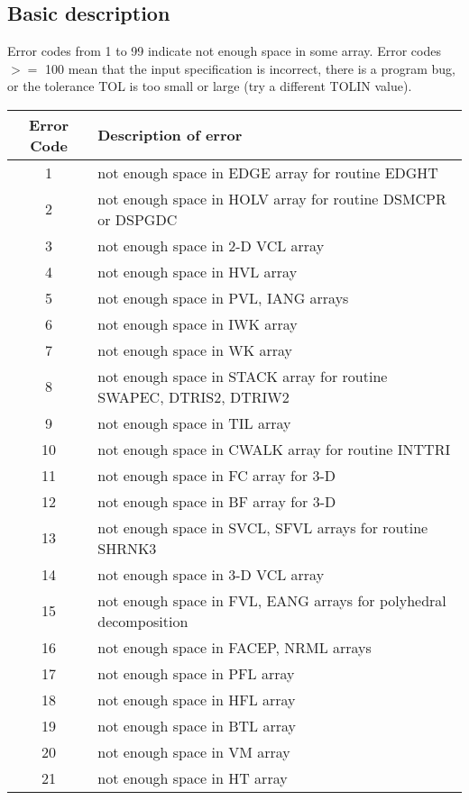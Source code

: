 \begin{appendix}
\section{Basic description}

Error codes from 1 to 99 indicate not enough space in some array.
Error codes $>=$ 100 mean that the input specification is incorrect,
there is a program bug, or the tolerance TOL is too small or large
(try a different TOLIN value).  

{\small
\begin{tabular}[h]{cp{5.5in}}
\bf Error Code &	\bf Description of error \\ 
 \hline
   1  &  not enough space in EDGE array for routine EDGHT \\
   2  &  not enough space in HOLV array for routine DSMCPR or DSPGDC \\
   3  &  not enough space in 2-D VCL array \\
   4  &  not enough space in HVL array \\
   5  &  not enough space in PVL, IANG arrays \\
   6  &  not enough space in IWK array \\
   7  &  not enough space in WK array \\
   8  &  not enough space in STACK array for routine SWAPEC, DTRIS2, DTRIW2 \\
   9  &  not enough space in TIL array \\
  10  &  not enough space in CWALK array for routine INTTRI \\
  11  &  not enough space in FC array for 3-D \\
  12  &  not enough space in BF array for 3-D \\
  13  &  not enough space in SVCL, SFVL arrays for routine SHRNK3 \\
  14  &  not enough space in 3-D VCL array \\
  15  &  not enough space in FVL, EANG arrays for polyhedral decomposition \\
  16  &  not enough space in FACEP, NRML arrays \\
  17  &  not enough space in PFL array \\
  18  &  not enough space in HFL array \\
  19  &  not enough space in BTL array \\
  20  &  not enough space in VM array \\
  21  &  not enough space in HT array \\

\end{tabular}}
\end{appendix}
